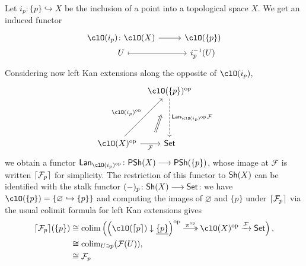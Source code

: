 \documentclass[11pt]{amsart}
\begin{document}
\begin{example}%
	Let $i_{p}\colon\{p\}\hookrightarrow X$ be the inclusion of a point into a topological space $X$. We get an induced functor
	\[
		\begin{tikzcd}[row sep=0.0em, column sep=2.7em,  ampersand replacement=\&]
			\clO(i_{p})\colon \clO(X)
			\arrow[r]
			\&
			\clO(\{p\})
			\\
			U
			\arrow[r, mapsto]
			\&
			i_{p}^{-1}(U)
		\end{tikzcd}
	\]%
	Considering now left Kan extensions along the opposite of $\clO(i_{p})$,
	\[
		\begin{tikzcd}[row sep={6.3em,between origins}, column sep={6.3em,between origins}, ampersand replacement=\&]
			{}
			\&
			\clO(\{p\})^{\op}
			\arrow[d, "\Lan_{\clO(i_{p})^{\op}}\mathcal{F}", dashed]
			\\
			\clO(X)^{\op}
			\arrow[ru, "\clO(i_{p})^{\op}"]
			\arrow[r, "\mathcal{F}"'{name=F}]
			\&
			\mathsf{Set}
			\arrow[from=F,to=1-2,shorten=1.75em,Rightarrow,xshift=-0.125em,yshift=-0.25em]
		\end{tikzcd}
	\]
	we obtain a functor $\Lan_{\clO(i_{p})^{\op}}\colon\PSh{X}\longrightarrow\PSh{\{p\}}$, whose image at $\mathcal{F}$ is written $\lceil\mathcal{F}_{p}\rceil$ for simplicity. The restriction of this functor to $\textsf{\upshape Sh}(X)$ can be identified with the stalk functor $(-)_{p}\colon\textsf{\upshape Sh}(X)\longrightarrow\mathsf{Set}$: we have $\clO(\{p\})=\{\varnothing\hookrightarrow\{p\}\}$ and computing the images of $\varnothing$ and $\{p\}$ under $\lceil\mathcal{F}_{p}\rceil$ via the usual colimit formula for left Kan extensions gives
	\begin{align*}
		\ceil{\mathcal{F}_{p}}(\{p\})       & \cong \colim\left(\left(\clO(\ceil{p})\downarrow\underline{\{p\}}\right)^{\op}\xlongertwoheadrightarrow{\pi^{\op}}\clO(X)^{\op}\xrightarrow{\mathcal{F}}\mathsf{Set}\right),       \\
		                                      & \cong \colim_{U\ni p}(\mathcal{F}(U)),                                                                                                                                                   \\
		                                      & \cong \mathcal{F}_{p}                                                                                                                                                                    \\

\end{align*}
\end{example}
\end{document}

